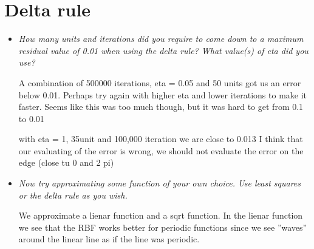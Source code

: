 \documentclass[a4paper,11pt]{article}
\begin{document}
\section{Delta rule}
\begin{itemize}

\item \textit{How many units and iterations did you require to come down to a maximum residual value of 0.01 when using the delta rule? What value(s) of eta did you use?}

A combination of 500000 iterations, eta = 0.05 and 50 units got us an error below 0.01. Perhaps try again with higher eta and lower iterations to make it faster.
Seems like this was too much though, but it was hard to get from 0.1 to 0.01

with eta = 1, 35unit and 100,000 iteration we are close to 0.013
I think that our evaluating of the error is wrong, we should not evaluate the error on the edge (close tu 0 and 2 pi)










\item \textit{Now try approximating some function of your own choice. Use least squares or the delta rule as you wish.}

We approximate a lienar function and a sqrt function. In the lienar function we see that the RBF works better for periodic functions since we see ''waves'' around the linear line as if the line was periodic.

\begin{figure}[h!]

\label{fig3}
\caption{}
\end{figure}
\end{itemize}
\end{document}
